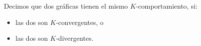 \documentclass[beamer]{standalone}
\begin{document}
\begin{standaloneframe}
  Decimos que dos gráficas tienen el mismo \alert{$K$-comportamiento}, si:
  \begin{itemize}
  \item las dos son $K$-convergentes, o
  \item las dos son $K$-divergentes.
  \end{itemize}
\end{standaloneframe}
\end{document}
